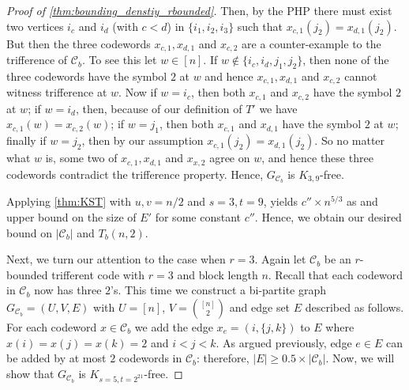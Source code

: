\documentclass[10pt,a4paper]{article}
\newcommand{\rbdtrifferentcodes}{$r$-bounded trifferent code}
\newcommand{\calC}{\mathcal{C}}
\newcommand{\set}[1]{\{#1\}}
\DeclareMathOperator{\1}{\mathbf{1}}
\begin{document}
\begin{proof}[Proof of \cref{thm:bounding_denstiy_rbounded}]
    Then, by the PHP there must exist two vertices $i_c$ and $i_d$ (with $c<d$) in $\set{i_1,i_2,i_3}$ such that $x_{c,1}(j_2)=x_{d,1}(j_2)$.
	But then the three codewords $x_{c,1},x_{d,1}$ and $x_{c,2}$ are a counter-example to the trifference of $\calC_b$.
	To see this let $w\in [n]$.
        If $w \notin \set{i_c,i_d,j_1, j_2}$, then none of the three codewords have the symbol $2$ at $w$ and hence $x_{c, 1}, x_{d, 1}$ and $x_{c, 2}$ cannot witness trifference at $w$.
        Now if $w=i_c$, then both $x_{c,1}$ and $x_{c,2}$ have the symbol $2$ at $w$; if $w=i_d$, then, because of our definition of $T'$ we have $x_{c,1}(w) = x_{c,2}(w)$; if $w=j_1$, then both $x_{c,1}$ and $x_{d,1}$ have the symbol $2$ at $w$; finally if $w=j_2$, then by our assumption $x_{c,1}(j_2)=x_{d,1}(j_2)$.
        So no matter what $w$ is, some two of $x_{c, 1}, x_{d, 1}$ and $x_{x, 2}$ agree on $w$, and hence these three codewords contradict the trifference property.
	Hence, $G_{\calC_b}$ is $K_{3,9}$-free.

	Applying \cref{thm:KST} with $u,v = n/2$ and $s=3,t=9$, yields $c''\times n^{5/3}$ as and upper bound on the size of $E'$ for some constant $c''$.
        Hence, we obtain our desired bound on $|\calC_b|$ and $T_b(n,2)$.

	Next, we turn our attention to the case when $r=3$.
	Again let $\calC_b$ be an \rbdtrifferentcodes{} with $r=3$ and block length $n$.
Recall that each codeword in $\calC_b$ now has three $2$'s.
	This time we construct a bi-partite graph $G_{\calC_b} = (U,V,E)$ with $U=[n]$, $V = \binom{[n]}{2}$ and edge set $E$ described as follows.
	For each codeword $x\in \calC_b$ we add the edge $x_e= (i,\set{j,k})$ to $E$ where $x(i) = x(j) = x(k)=2$ and $i<j<k$.
	As argued previously,  edge $e\in E$ can be added by at most $2$ codewords in $\calC_b$: therefore, $|E|\geq 0.5 \times |\calC_b|$.
	Now, we will show that $G_{\calC_b}$ is $K_{s=5,t=2^{21}}$-free. 


\end{proof}
\end{document}
